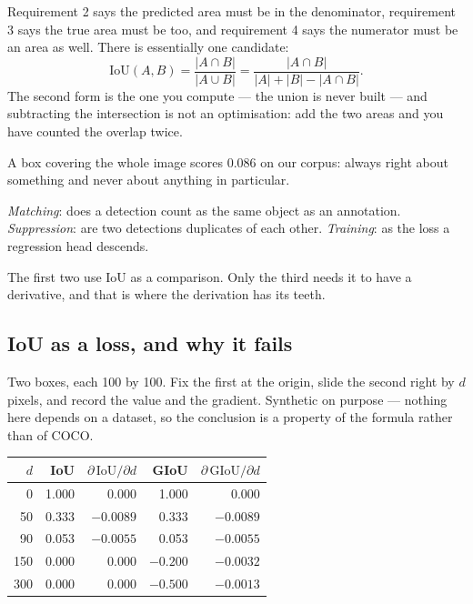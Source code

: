 \documentclass[11pt,a4paper]{article}
\begin{document}
Requirement 2 says the predicted area must be in the denominator, requirement 3
says the true area must be too, and requirement 4 says the numerator must be an
area as well. There is essentially one candidate:
\[ \mathrm{IoU}(A,B) = \frac{|A \cap B|}{|A \cup B|}
   = \frac{|A \cap B|}{|A| + |B| - |A \cap B|}. \]
The second form is the one you compute --- the union is never built --- and
subtracting the intersection is not an optimisation: add the two areas and you
have counted the overlap twice.

A box covering the whole image scores 0.086 on our corpus: always right about
something and never about anything in particular.

\begin{keybox}[title={IoU does three different jobs}]
\emph{Matching}: does a detection count as the same object as an annotation.
\emph{Suppression}: are two detections duplicates of each other.
\emph{Training}: as the loss a regression head descends.

The first two use IoU as a comparison. Only the third needs it to have a
derivative, and that is where the derivation has its teeth.
\end{keybox}

\subsection{IoU as a loss, and why it fails}

Two boxes, each 100 by 100. Fix the first at the origin, slide the second right
by $d$ pixels, and record the value and the gradient. Synthetic on purpose ---
nothing here depends on a dataset, so the conclusion is a property of the
formula rather than of COCO.

\begin{center}
\small
\begin{tabular}{rrrrr}
\toprule
$d$ & \textbf{IoU} & $\partial\,\mathrm{IoU}/\partial d$ &
\textbf{GIoU} & $\partial\,\mathrm{GIoU}/\partial d$ \\
\midrule
  0 & 1.000 &  0.000 &  1.000 &  0.000 \\
 50 & 0.333 & $-0.0089$ & 0.333 & $-0.0089$ \\
 90 & 0.053 & $-0.0055$ & 0.053 & $-0.0055$ \\
150 & 0.000 &  0.000 & $-0.200$ & $-0.0032$ \\
300 & 0.000 &  0.000 & $-0.500$ & $-0.0013$ \\
\bottomrule
\end{tabular}
\end{center}
\end{document}
